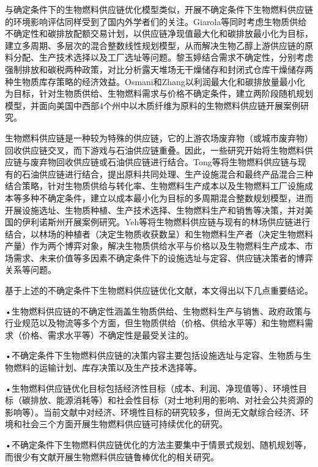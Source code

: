 与确定条件下的生物燃料供应链优化模型类似，开展不确定条件下生物燃料供应链的环境影响评估同样受到了国内外学者们的关注。Giarola等\cite{Giarola2012}同时考虑生物质供给不确定性和碳排放配额交易计划，以供应链净现值最大化和碳排放最小化为目标，建立多周期、多层次的混合整数线性规划模型，从而解决生物乙醇上游供应链的原料分配、生产技术选择以及工厂选址等问题。黎玉婷\cite{黎玉婷2013}结合需求不确定性，分别考虑强制排放和碳税两种政策，对比分析露天堆场无干燥储存和封闭式仓库干燥储存两种生物质库存策略的经济效益。Osmani和Zhang\cite{Osmani2014}以利润最大化和碳排放量最小化为目标，针对生物质供给、生物燃料需求与价格不确定条件，建立两阶段随机规划模型，并面向美国中西部4个州中以木质纤维为原料的生物燃料供应链开展案例研究。

生物燃料供应链是一种较为特殊的供应链，它的上游农场废弃物（或城市废弃物）回收供应链交叉，而下游戏与石油供应链重叠。因此，一些研究开始将生物燃料供应链与废弃物回收供应链或石油供应链进行结合。Tong等\cite{Tong2014}将生物燃料供应链与现有的石油供应链进行结合，提出原料共同处理、生产设施混合和最终产品混合三种结合策略，针对生物质供给与转化率、生物燃料生产成本以及生物燃料工厂设施成本等多种不确定条件，建立以成本最小化为目标的多周期混合整数规划模型，进而开展设施选址、生物质种植、生产技术选择、生物燃料生产和销售等决策，并对美国的伊利诺斯州开展案例研究。Yeh等\cite{Yeh2015}将生物燃料供应链与现有的林场供应链进行结合，以林场的种植者（决定生物质收获数呈）和生物燃料生产者（决定生物燃料产量）作为两个博弈对象，解决生物质供给水平与价格以及生物燃料生产成本、市场需求、未来价值等多因素不确定条件下的设施选址与定容、供应链决策者的博弈关系等问题。

基于上述的不确定条件下生物燃料供应链优化文献，本文得出以下几点重要结论。

•生物燃料供应链的不确定性涵盖生物质供给、生物燃料生产与销售、政府政策与行业规范以及物流等多个方面，但生物质供给（价格、供给水平等）和生物燃料需求（价格、需求水平等）不确定性是最受关注的。

•不确定条件下生物燃料供应链的决策内容主要包括设施选址与定容、生物质与生物燃料的运输计划、库存决策以及生产技术选择等。

•生物燃料供应链优化目标包括经济性目标（成本、利润、净现值等）、环境性目标（碳排放、能源消耗等）和社会性目标（对士地利用的影响、对社会公共资源的影响等）。当前文献中对经济、环境性目标的研究较多，但尚无文献综合经济、环境和社会三个方面开展生物燃料供应链可持续优化的研究。

•不确定条件下生物燃料供应链优化的方法主要集中于情景式规划、随机规划等，而很少有文献开展生物燃料供应链鲁棒优化的相关研究。


